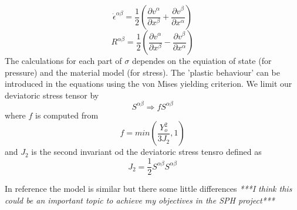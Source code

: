 \documentclass[10pt, twocolumn]{thesis}
\begin{document}
\[\dot{\epsilon}^{\alpha\beta}=\frac{1}{2}\left(\frac{\partial v^\alpha}{\partial x^\beta} + \frac{\partial v^\beta}{\partial x^\alpha}\right)\]
\[R^{\alpha\beta}=\frac{1}{2}\left(\frac{\partial v^\alpha}{\partial x^\beta} - \frac{\partial v^\beta}{\partial x^\alpha}\right)\]
The calculations for each part of $\sigma$ dependes on the equiation of state (for pressure) and the material model (for stress).
The 'plastic behaviour' can be introduced in the equations using the von Mises yielding criterion. We limit our deviatoric stress tensor by\cite{benz95}
\[S^{\alpha\beta}\Rightarrow fS^{\alpha\beta}\]
where $f$ is computed from
\[f=min\left(\frac{Y_o^2}{3J_2},1\right)\]
and $J_2$ is the second invariant od the deviatoric stress tensro defined as
\[J_2=\frac{1}{2}S^{\alpha\beta}S^{\alpha\beta}\]
\begin{scriptsize}
In reference \cite{allahdadi93} the model is similar but there some little differences
\textit{***I think this could be an important topic to achieve my objectives in the SPH project***}
\end{scriptsize}
\end{document}
